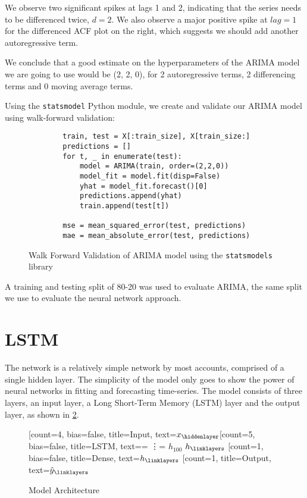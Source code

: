 We observe two significant spikes at lags 1 and 2, indicating that the series needs to be differenced twice, $d = 2$. We also observe a major positive spike at $lag=1$ for the differenced ACF plot on the right, which suggests we should add another autoregressive term.

We conclude that a good estimate on the hyperparameters of the ARIMA model we are going to use would be (2, 2, 0), for 2 autoregressive terms, 2 differencing terms and 0 moving average terms.

Using the \texttt{statsmodel} Python module, we create and validate our ARIMA model using walk-forward validation:

\begin{figure}[H]
    \begin{verbatim}
        train, test = X[:train_size], X[train_size:]
        predictions = []
        for t, _ in enumerate(test):
            model = ARIMA(train, order=(2,2,0))
            model_fit = model.fit(disp=False)
            yhat = model_fit.forecast()[0]
            predictions.append(yhat)
            train.append(test[t])

        mse = mean_squared_error(test, predictions)
        mae = mean_absolute_error(test, predictions)
    \end{verbatim}
    \caption{Walk Forward Validation of ARIMA model using the \texttt{statsmodels} library}
    \label{code:arima}
\end{figure}

A training and testing split of 80-20 was used to evaluate ARIMA, the same split we use to evaluate the neural network approach.

\section{LSTM}
The network is a relatively simple network by most accounts, comprised of a single hidden layer. The simplicity of the model only goes to show the power of neural networks in fitting and forecasting time-series. The model consists of three layers, an input layer, a Long Short-Term Memory (LSTM) layer and the output layer, as shown in \ref{tab:model_arch}.

\begin{figure}[H]
    \centering
    \begin{neuralnetwork}[height=4]
        \newcommand{\x}[2]{$x_#2$}
        \newcommand{\y}[2]{$\hat{y}_#2$}
        \newcommand{\h}[2]{$h_#2$}
        \newcommand{\hlast}[2]{\ifnum4=#2 \vdots \else \ifnum5=#2 $h_{100}$ \else $h_#2$ \fi \fi}
        [count=4, bias=false, title=Input, text=\x]
        \hiddenlayer[count=5, bias=false, title=LSTM, text=\hlast] 
        \linklayers
        \hiddenlayer[count=1, bias=false, title=Dense, text=\h]
        \linklayers
        \outputlayer[count=1, title=Output, text=\y] 
        \linklayers
    \end{neuralnetwork}
    \caption{Model Architecture}
    \label{tab:model_arch}
\end{figure}

